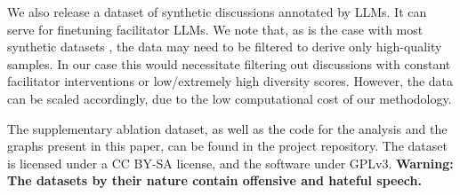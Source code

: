 %

We also release \vmd\datasetlink a dataset of synthetic discussions annotated by LLMs. It can serve for finetuning facilitator LLMs. We note that, as is the case with most synthetic datasets \citep{ulmer2024}, the data may need to be filtered to derive only high-quality samples. In our case this would necessitate filtering out discussions with constant facilitator interventions or low/extremely high diversity scores. However, the data can be scaled accordingly, due to the low computational cost of our methodology.

 The supplementary ablation dataset, as well as the code for the analysis and the graphs present in this paper, can be found in the project repository\analysislink. The dataset is licensed under a CC BY-SA license, and the software under GPLv3. \textbf{Warning: The datasets by their nature contain offensive and hateful speech.}